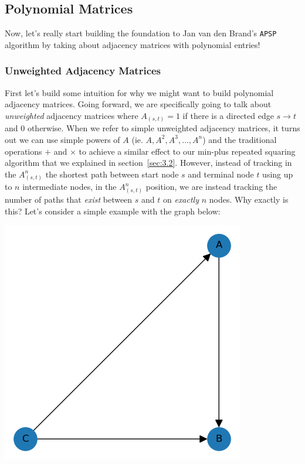 \documentclass[12pt]{article}
\begin{document}
\subsection{Polynomial Matrices} \label{sec:3.3}

Now, let's really start building the foundation to Jan van den Brand's \texttt{APSP} algorithm by taking about adjacency matrices with polynomial entries!

\subsubsection{Unweighted Adjacency Matrices}

First let's build some intuition for why we might want to build polynomial adjacency matrices. Going forward, we are specifically going to talk about \emph{unweighted} adjacency matrices where $A_{(s, t)} = 1$ if there is a directed edge $s \to t$ and $0$ otherwise. When we refer to simple unweighted adjacency matrices, it turns out we can use simple powers of $A$ (ie. $A, A^2, A^3, \ldots, A^n$) and the traditional operations $+$ and $\times$ to achieve a similar effect to our min-plus repeated squaring algorithm that we explained in section~\ref{sec:3.2}. However, instead of tracking in the $A^n_{(s, t)}$ the shortest path between start node $s$ and terminal node $t$ using up to $n$ intermediate nodes, in the $A^n_{(s, t)}$ position, we are instead tracking the number of paths that \emph{exist} between $s$ and $t$ on \emph{exactly} $n$ nodes. Why exactly is this? Let's consider a simple example with the graph below:

\begin{center}
    \includegraphics[scale=0.5]{media/Figure_2.png}
\end{center}
\end{document}
